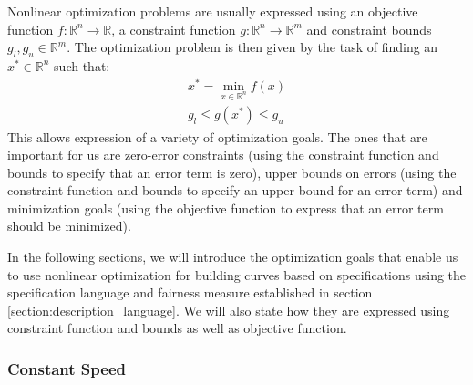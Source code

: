 \documentclass[a4paper]{article}
\newcommand{\apply}[2]{#1\!\left(#2\right)}
\begin{document}
				Nonlinear optimization problems are usually expressed using an objective function \(f : \mathbb{R}^n \rightarrow \mathbb{R}\), a constraint function \(g : \mathbb{R}^n \rightarrow \mathbb{R}^m\) and constraint bounds \(g_l, g_u \in \mathbb{R}^m\). The optimization problem is then given by the task of finding an \(x^* \in \mathbb{R}^n\) such that:
				\begin{equation*}
					\begin{aligned}
						x^* = \min_{x \in \mathbb{R}^n} \apply{f}{x}\\
						g_l \leq \apply{g}{x^*} \leq g_u
					\end{aligned}
				\end{equation*}
				This allows expression of a variety of optimization goals. The ones that are important for us are zero-error constraints (using the constraint function and bounds to specify that an error term is zero), upper bounds on errors (using the constraint function and bounds to specify an upper bound for an error term) and minimization goals (using the objective function to express that an error term should be minimized).

				In the following sections, we will introduce the optimization goals that enable us to use nonlinear optimization for building curves based on specifications using the specification language and fairness measure established in section \ref{section:description_language}. We will also state how they are expressed using constraint function and bounds as well as objective function.

			\subsubsection{Constant Speed}
			\label{section:constant_speed}
\end{document}
